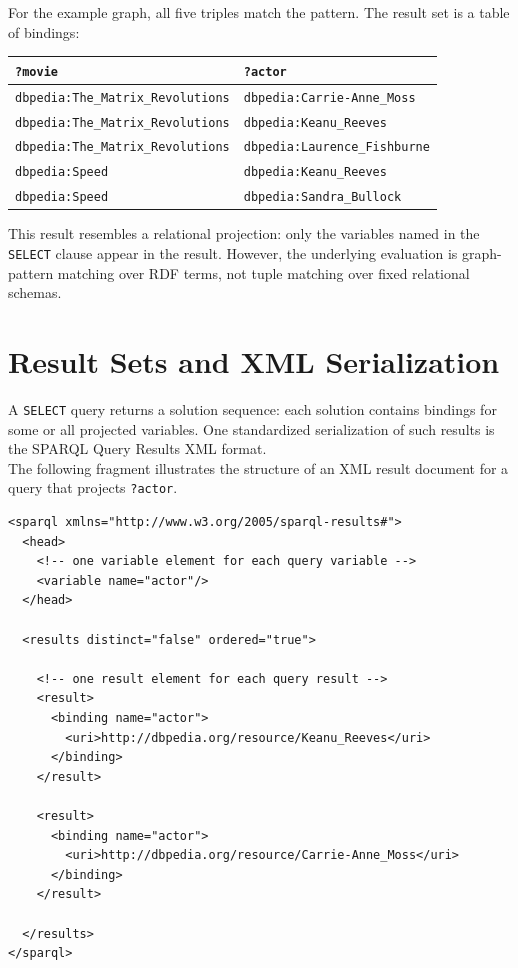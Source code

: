 \documentclass{scrbook}
\begin{document}
	For the example graph, all five triples match the pattern. The result set is a table of bindings:
	
\begin{center}
	\begin{tabular}{ll}
		\textbf{\texttt{?movie}} & \textbf{\texttt{?actor}} \\
		\hline
		\texttt{dbpedia:The\_Matrix\_Revolutions} & \texttt{dbpedia:Carrie-Anne\_Moss} \\
		\texttt{dbpedia:The\_Matrix\_Revolutions} & \texttt{dbpedia:Keanu\_Reeves} \\
		\texttt{dbpedia:The\_Matrix\_Revolutions} & \texttt{dbpedia:Laurence\_Fishburne} \\
		\texttt{dbpedia:Speed} & \texttt{dbpedia:Keanu\_Reeves} \\
		\texttt{dbpedia:Speed} & \texttt{dbpedia:Sandra\_Bullock}
	\end{tabular}
\end{center}
	
	This result resembles a relational projection: only the variables named in the \texttt{SELECT} clause appear in the result. However, the underlying evaluation is graph-pattern matching over RDF terms, not tuple matching over fixed relational schemas.
	
	\section{Result Sets and XML Serialization}
	
	A \texttt{SELECT} query returns a solution sequence: each solution contains bindings for some or all projected variables. One standardized serialization of such results is the SPARQL Query Results XML format.\\
	
	The following fragment illustrates the structure of an XML result document for a query that projects \texttt{?actor}.
	
	\begin{lstlisting}
<sparql xmlns="http://www.w3.org/2005/sparql-results#">
  <head>
    <!-- one variable element for each query variable -->
    <variable name="actor"/>
  </head>

  <results distinct="false" ordered="true">
    
    <!-- one result element for each query result -->
    <result>
      <binding name="actor">
        <uri>http://dbpedia.org/resource/Keanu_Reeves</uri>
      </binding>
    </result>
	
    <result>
      <binding name="actor">
        <uri>http://dbpedia.org/resource/Carrie-Anne_Moss</uri>
      </binding>
    </result>
    
  </results>
</sparql>
	\end{lstlisting}
	
\end{document}
